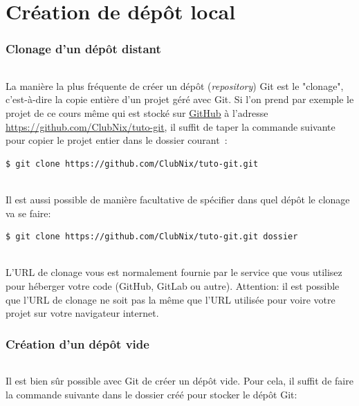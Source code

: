 \documentclass[french, a4paper, 12pt, titlepage]{article}
\begin{document}
\newpage
\part{Création de dépôt local}

\section{Clonage d'un dépôt distant}

\paragraph{} La manière la plus fréquente de créer un dépôt
(\emph{repository}) Git est le "clonage", c'est-à-dire la copie entière d'un projet géré avec Git. Si l'on prend par exemple le projet de ce cours même qui est stocké sur \href{https://github.com}{GitHub} à l'adresse
\url{https://github.com/ClubNix/tuto-git}, il suffit de taper la commande suivante pour copier le projet entier dans le dossier courant~:

\begin{lstlisting}
$ git clone https://github.com/ClubNix/tuto-git.git
\end{lstlisting}
\paragraph{}Il est aussi possible de manière facultative de spécifier dans quel dépôt le clonage va se faire:
\begin{lstlisting}
$ git clone https://github.com/ClubNix/tuto-git.git dossier
\end{lstlisting}

\paragraph{} L'URL de clonage vous est normalement fournie par le service que
vous utilisez pour héberger votre code (GitHub, GitLab ou autre). Attention: il
est possible que l'URL de clonage ne soit pas la même que l'URL utilisée pour
voire votre projet sur votre navigateur internet.

\section{Création d'un dépôt vide}

\paragraph{} Il est bien sûr possible avec Git de créer un dépôt vide. Pour cela, il suffit de faire la commande suivante dans le dossier créé pour stocker le dépôt Git:
\end{document}
